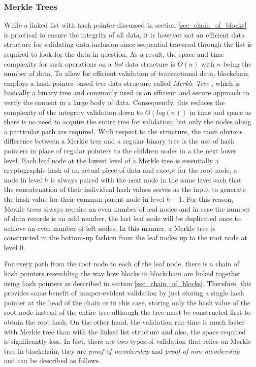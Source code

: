 \subsubsection{Merkle Trees}\label{sec_merkle_tree}

While a linked list with hash pointer discussed in section \ref{sec_chain_of_blocks} is practical to ensure the integrity of all data, it is however not an efficient data structure for validating data inclusion since sequential traversal through the list is required to look for the data in question. As a result, the space and time complexity for such operations on a \textit{list} data structure is $O(n)$ with $n$ being the number of data. To allow for efficient validation of transactional data, blockchain employs a hash-pointer-based \textit{tree} data structure called \textit{Merkle Tree} \cite{merkle1982method, merkle1987digital}, which is basically a binary tree and commonly used as an efficient and secure approach to verify the content in a large body of data. Consequently, this reduces the complexity of the integrity validation down to $O(log(n))$ in time and space as there is no need to acquire the entire tree for validation, but only the nodes along a particular path are required. With respect to the structure, the most obvious difference between a Merkle tree and a regular binary tree is the use of hash pointers in place of regular pointers to the children nodes in a the next lower level. Each leaf node at the lowest level of a Merkle tree is essentially a cryptographic hash of an actual piece of data and except for the root node, a node in level $h$ is always paired with the next node in the same level such that the concatenation of their individual hash values serves as the input to generate the hash value for their common parent node in level $h-1$. For this reason, Merkle trees always require an even number of leaf nodes and in case the number of data records is an odd number, the last leaf node will be duplicated once to achieve an even number of left nodes. In this manner, a Merkle tree is constructed in the bottom-up fashion from the leaf nodes up to the root node at level $0$. 

For every path from the root node to each of the leaf node, there is a chain of hash pointers resembling the way how blocks in blockchain are linked together using hash pointers as described in section \ref{sec_chain_of_blocks}. Therefore, this provides same benefit of tamper-evident validation by just storing a single hash pointer at the head of the chain or in this case, storing only the hash value of the root node instead of the entire tree although the tree must be constructed first to obtain the root hash. On the other hand, the validation run-time is much faster with Merkle tree than with the linked list structure and also, the space required is significantly less. 
In fact, there are two types of validation that relies on Merkle tree in blockchain, they are \textit{proof of membership} and \textit{proof of non-membership} \cite{narayanan2016bitcoin} and can be described as follows.

